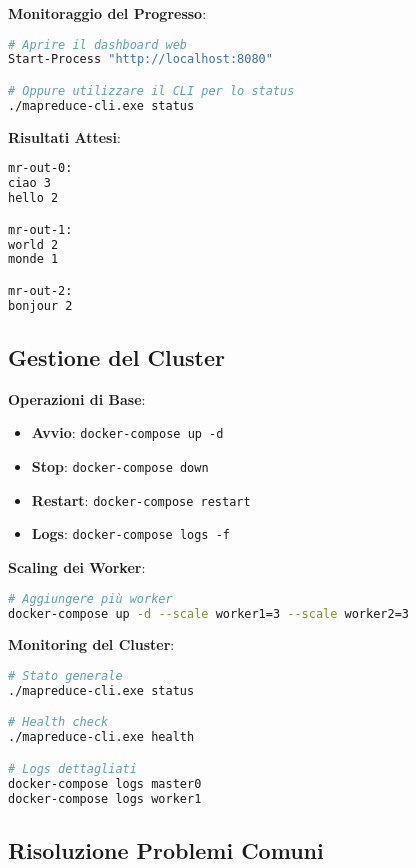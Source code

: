 \documentclass[12pt,a4paper]{article}
\begin{document}
\textbf{Monitoraggio del Progresso}:
\begin{lstlisting}[language=bash, caption=Monitoraggio tramite dashboard]
# Aprire il dashboard web
Start-Process "http://localhost:8080"

# Oppure utilizzare il CLI per lo status
./mapreduce-cli.exe status
\end{lstlisting}

\textbf{Risultati Attesi}:
\begin{lstlisting}[language=bash, caption=File di output generati]
mr-out-0:
ciao 3
hello 2

mr-out-1:
world 2
monde 1

mr-out-2:
bonjour 2
\end{lstlisting}

\subsection{Gestione del Cluster}

\textbf{Operazioni di Base}:
\begin{itemize}
\item \textbf{Avvio}: \texttt{docker-compose up -d}
\item \textbf{Stop}: \texttt{docker-compose down}
\item \textbf{Restart}: \texttt{docker-compose restart}
\item \textbf{Logs}: \texttt{docker-compose logs -f}
\end{itemize}

\textbf{Scaling dei Worker}:
\begin{lstlisting}[language=bash, caption=Scaling orizzontale]
# Aggiungere più worker
docker-compose up -d --scale worker1=3 --scale worker2=3
\end{lstlisting}

\textbf{Monitoring del Cluster}:
\begin{lstlisting}[language=bash, caption=Comandi di monitoring]
# Stato generale
./mapreduce-cli.exe status

# Health check
./mapreduce-cli.exe health

# Logs dettagliati
docker-compose logs master0
docker-compose logs worker1
\end{lstlisting}

\subsection{Risoluzione Problemi Comuni}
\end{document}
